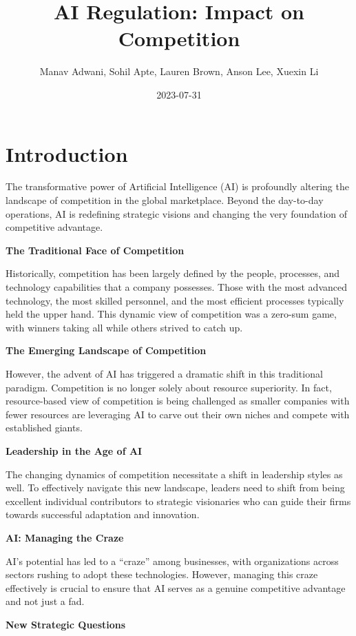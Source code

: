 \documentclass[
]{book}
\title{AI Regulation: Impact on Competition}
\author{Manav Adwani, Sohil Apte, Lauren Brown, Anson Lee, Xuexin Li}
\date{2023-07-31}
\begin{document}
\maketitle

{
\setcounter{tocdepth}{1}
\tableofcontents
}
\hypertarget{introduction}{%
\chapter{Introduction}\label{introduction}}

The transformative power of Artificial Intelligence (AI) is profoundly altering the landscape of competition in the global marketplace. Beyond the day-to-day operations, AI is redefining strategic visions and changing the very foundation of competitive advantage.

\textbf{The Traditional Face of Competition}

Historically, competition has been largely defined by the people, processes, and technology capabilities that a company possesses. Those with the most advanced technology, the most skilled personnel, and the most efficient processes typically held the upper hand. This dynamic view of competition was a zero-sum game, with winners taking all while others strived to catch up.

\textbf{The Emerging Landscape of Competition}

However, the advent of AI has triggered a dramatic shift in this traditional paradigm. Competition is no longer solely about resource superiority. In fact, resource-based view of competition is being challenged as smaller companies with fewer resources are leveraging AI to carve out their own niches and compete with established giants.

\textbf{Leadership in the Age of AI}

The changing dynamics of competition necessitate a shift in leadership styles as well. To effectively navigate this new landscape, leaders need to shift from being excellent individual contributors to strategic visionaries who can guide their firms towards successful adaptation and innovation.

\textbf{AI: Managing the Craze}

AI's potential has led to a ``craze'' among businesses, with organizations across sectors rushing to adopt these technologies. However, managing this craze effectively is crucial to ensure that AI serves as a genuine competitive advantage and not just a fad.

\textbf{New Strategic Questions}
\end{document}
